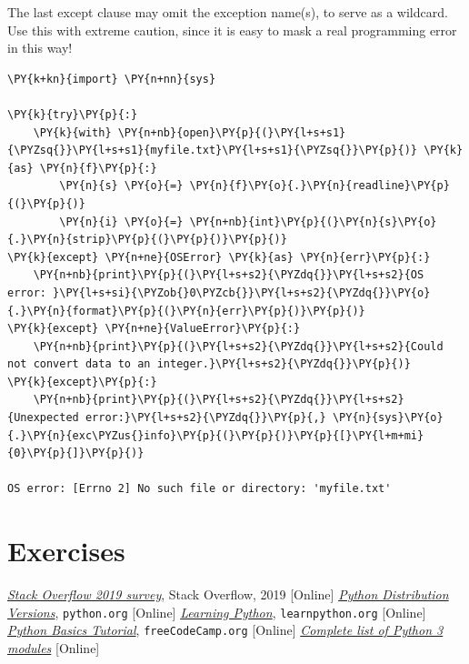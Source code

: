 The last except clause may omit the exception name(s), to serve as a wildcard.
Use this with extreme caution, since it is easy to mask a real programming 
error in this way! 

\begin{codebox}
	\begin{Verbatim}[commandchars=\\\{\}]
\PY{k+kn}{import} \PY{n+nn}{sys}
	
\PY{k}{try}\PY{p}{:}
    \PY{k}{with} \PY{n+nb}{open}\PY{p}{(}\PY{l+s+s1}{\PYZsq{}}\PY{l+s+s1}{myfile.txt}\PY{l+s+s1}{\PYZsq{}}\PY{p}{)} \PY{k}{as} \PY{n}{f}\PY{p}{:}
        \PY{n}{s} \PY{o}{=} \PY{n}{f}\PY{o}{.}\PY{n}{readline}\PY{p}{(}\PY{p}{)}
        \PY{n}{i} \PY{o}{=} \PY{n+nb}{int}\PY{p}{(}\PY{n}{s}\PY{o}{.}\PY{n}{strip}\PY{p}{(}\PY{p}{)}\PY{p}{)}
\PY{k}{except} \PY{n+ne}{OSError} \PY{k}{as} \PY{n}{err}\PY{p}{:}
    \PY{n+nb}{print}\PY{p}{(}\PY{l+s+s2}{\PYZdq{}}\PY{l+s+s2}{OS error: }\PY{l+s+si}{\PYZob{}0\PYZcb{}}\PY{l+s+s2}{\PYZdq{}}\PY{o}{.}\PY{n}{format}\PY{p}{(}\PY{n}{err}\PY{p}{)}\PY{p}{)}
\PY{k}{except} \PY{n+ne}{ValueError}\PY{p}{:}
    \PY{n+nb}{print}\PY{p}{(}\PY{l+s+s2}{\PYZdq{}}\PY{l+s+s2}{Could not convert data to an integer.}\PY{l+s+s2}{\PYZdq{}}\PY{p}{)}
\PY{k}{except}\PY{p}{:}
    \PY{n+nb}{print}\PY{p}{(}\PY{l+s+s2}{\PYZdq{}}\PY{l+s+s2}{Unexpected error:}\PY{l+s+s2}{\PYZdq{}}\PY{p}{,} \PY{n}{sys}\PY{o}{.}\PY{n}{exc\PYZus{}info}\PY{p}{(}\PY{p}{)}\PY{p}{[}\PY{l+m+mi}{0}\PY{p}{]}\PY{p}{)}
	
OS error: [Errno 2] No such file or directory: 'myfile.txt'
\end{Verbatim}
\end{codebox}

\section{Exercises}


\begin{thebibliography}{9}
 \href{https://insights.stackoverflow.com/survey/2019}{\emph{Stack Overflow 2019 survey}}, Stack Overflow, 2019 [Online]
 \href{https://www.python.org/downloads/}{\emph{Python Distribution Versions}}, \texttt{python.org} [Online]
 \href{https://www.learnpython.org/it/}{\emph{Learning Python}}, \texttt{learnpython.org} [Online]
 \href{https://www.youtube.com/watch?v=8DvywoWv6fI}{\emph{Python Basics Tutorial}}, \texttt{freeCodeCamp.org} [Online]
 \href{https://docs.python.org/3/py-modindex.html}{\emph{Complete list of Python 3 modules}} [Online]
\end{thebibliography}
